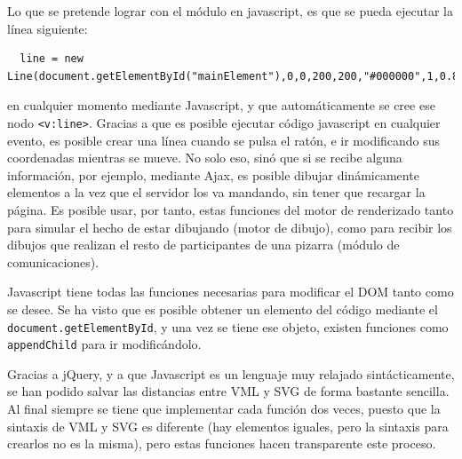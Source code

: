 Lo que se pretende lograr con el módulo en javascript, es que se pueda ejecutar la línea siguiente:
\begin{verbatim}
  line = new Line(document.getElementById("mainElement"),0,0,200,200,"#000000",1,0.8);
\end{verbatim}
en cualquier momento mediante Javascript, y que automáticamente se cree ese nodo \texttt{<v:line>}. Gracias a que es posible ejecutar código javascript en cualquier evento, es posible crear una línea cuando se pulsa el ratón, e ir modificando sus coordenadas mientras se mueve. No solo eso, sinó que si se recibe alguna información, por ejemplo, mediante Ajax, es posible dibujar dinámicamente elementos a la vez que el servidor los va mandando, sin tener que recargar la página. Es posible usar, por tanto, estas funciones del motor de renderizado tanto para simular el hecho de estar dibujando (motor de dibujo), como para recibir los dibujos que realizan el resto de participantes de una pizarra (módulo de comunicaciones).

Javascript tiene todas las funciones necesarias para modificar el DOM tanto como se desee. Se ha visto que es posible obtener un elemento del código mediante el \texttt{document.getElementById}, y una vez se tiene ese objeto, existen funciones como \texttt{appendChild} para ir modificándolo.

Gracias a jQuery, y a que Javascript es un lenguaje muy relajado sintácticamente, se han podido salvar las distancias entre VML y SVG de forma bastante sencilla. Al final siempre se tiene que implementar cada función dos veces, puesto que la sintaxis de VML y SVG es diferente (hay elementos iguales, pero la sintaxis para crearlos no es la misma), pero estas funciones hacen transparente este proceso. 
